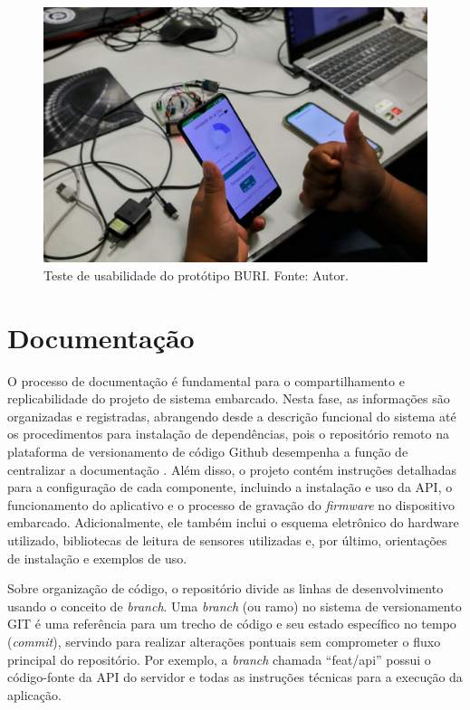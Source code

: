\begin{figure}[ht]
    \centering
    \includegraphics[width=.60\textwidth]{img/testes-praticos/hardware/testeBuriHardware1.jpeg}
    \caption{Teste de usabilidade do protótipo BURI. Fonte: Autor.}\label{figTesteHardware}
\end{figure}

\section{Documentação}\label{fase6}

O processo de documentação é fundamental para o compartilhamento e replicabilidade do projeto de sistema 
embarcado. Nesta fase, as informações são organizadas e registradas, abrangendo desde a descrição funcional do sistema até 
os procedimentos para instalação de dependências, pois o repositório remoto na plataforma de versionamento de código Github desempenha
a função de centralizar a documentação \cite{github}. Além disso, o projeto contém instruções detalhadas para a configuração de cada componente, 
incluindo a instalação e uso da API, o funcionamento do aplicativo e o processo de gravação do \textit{firmware} no dispositivo embarcado. Adicionalmente, 
ele também inclui o esquema eletrônico do hardware utilizado, bibliotecas de leitura de sensores utilizadas e, por último, orientações de instalação e exemplos de uso. 

Sobre organização de código, o repositório divide as linhas de desenvolvimento usando o conceito de \textit{branch}. Uma \textit{branch} (ou ramo) no sistema de versionamento GIT \cite{git-branch} é uma referência 
para um trecho de código e seu estado específico no tempo (\textit{commit}), servindo para realizar alterações pontuais sem comprometer o fluxo principal do repositório. Por exemplo, a \textit{branch} chamada 
``feat/api'' possui o código-fonte da API do servidor e todas as instruções técnicas para a execução da aplicação.

